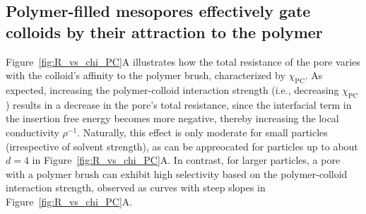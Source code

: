 \documentclass[12pt, a4paper]{article}
\begin{document}


\subsection{Polymer-filled mesopores effectively gate colloids by their attraction to the polymer}


Figure~\ref{fig:R_vs_chi_PC}A illustrates how the total resistance of the pore varies with the colloid's affinity to the polymer brush, characterized by $\chi_{\text{PC}}$.
As expected, increasing the polymer-colloid interaction strength (i.e., decreasing $\chi_{\text{PC}}$) results in a decrease in the pore's total resistance, since the interfacial term in the insertion free energy becomes more negative, thereby increasing the local conductivity $\rho^{-1}$.
Naturally, this effect is only moderate for small particles (irrespective of solvent strength), as can be appreocated for particles up to about $d = 4$ in Figure~\ref{fig:R_vs_chi_PC}A.
In contrast, for larger particles, a pore with a polymer brush can exhibit high selectivity based on the polymer-colloid interaction strength, observed as curves with steep slopes in Figure~\ref{fig:R_vs_chi_PC}A.
\end{document}
